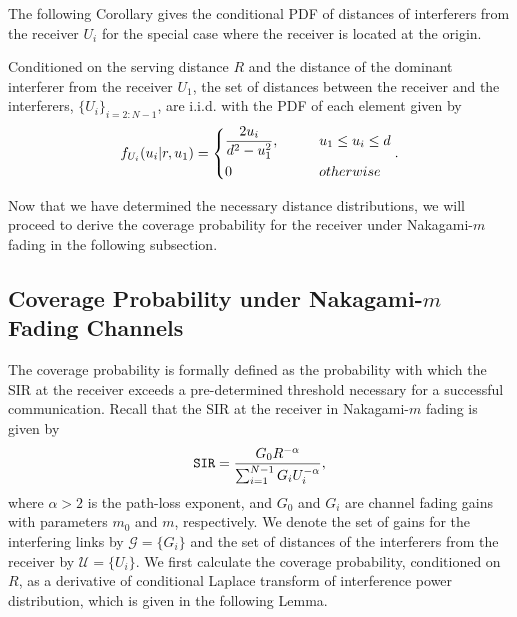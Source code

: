 \documentclass[journal,draftclsnofoot,onecolumn,12pt]{IEEEtran}
\begin{document}
The following Corollary gives the conditional PDF of distances of interferers from the receiver $U_i$ for the special case where the receiver is located at the origin.
\begin{cor}
Conditioned on the serving distance $R$ and the distance of the dominant interferer from the receiver $U_1$, the set of distances between the receiver and the interferers, $\{U_i\}_{i=2:N-1}$, are i.i.d. with the PDF of each element given by
\begin{align}
f_{U_i}(u_i | r, u_1) = \begin{dcases}
\frac{2u_i}{d^2 - u_1^2}, \qquad &u_1 \leq u_i \leq d \\
0 \qquad &otherwise
\end{dcases}.
\end{align}
\end{cor}
Now that we have determined the necessary distance distributions, we will proceed to derive the coverage probability for the receiver under Nakagami-$m$ fading in the following subsection.

\subsection{Coverage Probability under Nakagami-$m$ Fading Channels}
The coverage probability is formally defined as the probability with which the SIR at the receiver exceeds a pre-determined threshold necessary for a successful communication. Recall that the SIR at the receiver in Nakagami-$m$ fading is given by
\begin{align*}
\mathtt{SIR} = \frac{G_0 R^{-\alpha}}{\sum_{i=1}^{N-1} G_i U_i^{-\alpha}},
\end{align*}
where $\alpha > 2$ is the path-loss exponent, and $G_0$ and $G_i$ are channel fading gains with parameters $m_0$ and $m$, respectively. We denote the set of gains for the interfering links by $\mathcal{G}=\{G_i\}$ and the set of distances of the interferers from the receiver by $\mathcal{U}=\{U_i\}$. We first calculate the coverage probability, conditioned on $R$, as a derivative of conditional Laplace transform of interference power distribution, which is given in the following Lemma. 
\end{document}
